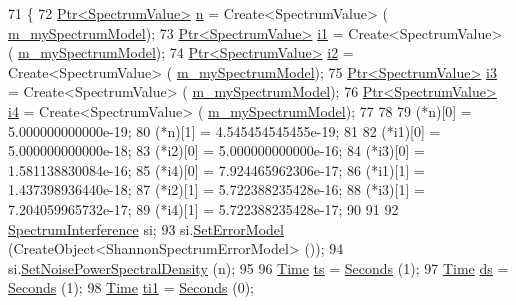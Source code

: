 \begin{DoxyCode}
71 \{
72   \hyperlink{classns3_1_1Ptr}{Ptr<SpectrumValue>} \hyperlink{namespacesample-rng-plot_aeb5ee5c431e338ef39b7ac5431242e1d}{n} = Create<SpectrumValue> (
      \hyperlink{classSpectrumInterferenceTestCase_aabc7b5e184368e1912653f66ad1330df}{m\_mySpectrumModel});
73   \hyperlink{classns3_1_1Ptr}{Ptr<SpectrumValue>} \hyperlink{generate__test__data__lte__sinr_8m_ac6ef61fb0fec52abd81fd71388742cc0}{i1} = Create<SpectrumValue> (
      \hyperlink{classSpectrumInterferenceTestCase_aabc7b5e184368e1912653f66ad1330df}{m\_mySpectrumModel});
74   \hyperlink{classns3_1_1Ptr}{Ptr<SpectrumValue>} \hyperlink{generate__test__data__lte__sinr_8m_a2fce890a7c411f1fe7c0c55ec9eb4106}{i2} = Create<SpectrumValue> (
      \hyperlink{classSpectrumInterferenceTestCase_aabc7b5e184368e1912653f66ad1330df}{m\_mySpectrumModel});
75   \hyperlink{classns3_1_1Ptr}{Ptr<SpectrumValue>} \hyperlink{generate__test__data__lte__sinr_8m_abc662ad7939244d9dc80a99f233212bf}{i3} = Create<SpectrumValue> (
      \hyperlink{classSpectrumInterferenceTestCase_aabc7b5e184368e1912653f66ad1330df}{m\_mySpectrumModel});
76   \hyperlink{classns3_1_1Ptr}{Ptr<SpectrumValue>} \hyperlink{generate__test__data__lte__sinr_8m_a608e2266a7f74d5814905a52df1fc084}{i4} = Create<SpectrumValue> (
      \hyperlink{classSpectrumInterferenceTestCase_aabc7b5e184368e1912653f66ad1330df}{m\_mySpectrumModel});
77 
78 
79   (*n)[0] = 5.000000000000e-19;
80   (*n)[1] = 4.545454545455e-19;
81 
82   (*i1)[0] = 5.000000000000e-18;
83   (*i2)[0] = 5.000000000000e-16;
84   (*i3)[0] = 1.581138830084e-16;
85   (*i4)[0] = 7.924465962306e-17;
86   (*i1)[1] = 1.437398936440e-18;
87   (*i2)[1] = 5.722388235428e-16;
88   (*i3)[1] = 7.204059965732e-17;
89   (*i4)[1] = 5.722388235428e-17;
90 
91 
92   \hyperlink{classns3_1_1SpectrumInterference}{SpectrumInterference} si;
93   si.\hyperlink{classns3_1_1SpectrumInterference_a629cc5ee029790d9b3d511fc13761bea}{SetErrorModel} (CreateObject<ShannonSpectrumErrorModel> ());
94   si.\hyperlink{classns3_1_1SpectrumInterference_a2252ceedb5f3eaeaaca0ab06e2d63f47}{SetNoisePowerSpectralDensity} (n);
95 
96   \hyperlink{classns3_1_1Time}{Time} \hyperlink{lte_2model_2fading-traces_2fading__trace__generator_8m_ada841f58d7be618bfbc76c87e7d44086}{ts}  = \hyperlink{group__timecivil_ga33c34b816f8ff6628e33d5c8e9713b9e}{Seconds} (1);
97   \hyperlink{classns3_1_1Time}{Time} \hyperlink{generate__test__data__lte__sinr_8m_a4ab47e54c2f73ad4c0eb3974709721cd}{ds}  = \hyperlink{group__timecivil_ga33c34b816f8ff6628e33d5c8e9713b9e}{Seconds} (1);
98   \hyperlink{classns3_1_1Time}{Time} \hyperlink{generate__test__data__lte__sinr_8m_a1bfa18fb095561511787c65c1f135ccf}{ti1} = \hyperlink{group__timecivil_ga33c34b816f8ff6628e33d5c8e9713b9e}{Seconds} (0);

\end{DoxyCode}

